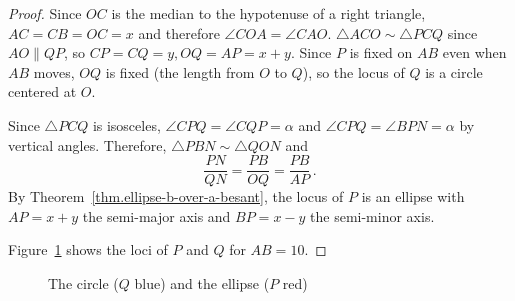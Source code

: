 
\begin{proof}
Since $OC$ is the median to the hypotenuse of a right triangle, $AC=CB=OC=x$  and therefore $\angle COA=\angle CAO$. $\triangle ACO\sim \triangle PCQ$ since $AO\parallel QP$, so $CP=CQ=y, OQ=AP=x+y$. Since $P$ is fixed on $AB$ even when $AB$ moves, $OQ$ is fixed (the length from $O$ to $Q$), so the locus of $Q$ is a circle centered at $O$.

Since $\triangle PCQ$ is isosceles, $\angle CPQ=\angle CQP=\alpha$ and $\angle CPQ=\angle BPN=\alpha$ by vertical angles. Therefore, $\triangle PBN\sim \triangle QON$ and
\[
\frac{PN}{QN}=\frac{PB}{OQ}=\frac{PB}{AP}\,.
\]
By Theorem~\ref{thm.ellipse-b-over-a-besant}, the locus of $P$ is an ellipse with $AP=x+y$ the semi-major axis and $BP=x-y$ the semi-minor axis.

Figure~\ref{f.glissette2} shows the loci of $P$ and $Q$ for $AB=10$.\hqed
\end{proof}

\begin{figure}[t]
\begin{center}
\caption{The circle ($Q$ blue) and the ellipse ($P$ red)}\label{f.glissette2}
\end{center}
\end{figure}


